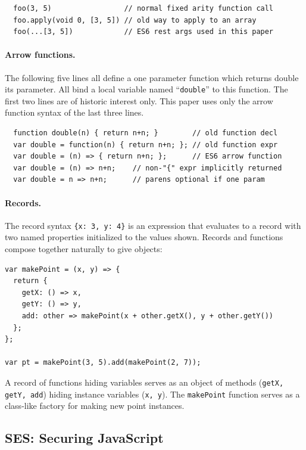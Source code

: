 \documentclass{llncs}
\begin{document}
\begin{verbatim}
  foo(3, 5)                 // normal fixed arity function call
  foo.apply(void 0, [3, 5]) // old way to apply to an array
  foo(...[3, 5])            // ES6 rest args used in this paper
\end{verbatim}

\paragraph{Arrow functions.} The following five lines all define a one parameter function which returns double its parameter. All bind a local variable named ``{\tt double}'' to this function. The first two lines are of historic interest only. This paper uses only the arrow function syntax of the last three lines.

\begin{verbatim}
  function double(n) { return n+n; }        // old function decl
  var double = function(n) { return n+n; }; // old function expr
  var double = (n) => { return n+n; };      // ES6 arrow function
  var double = (n) => n+n;    // non-"{" expr implicitly returned
  var double = n => n+n;      // parens optional if one param
\end{verbatim}

\paragraph{Records.} The record syntax {\tt \{x: 3, y: 4\}} is an expression that evaluates to a record with two named properties initialized to the values shown. Records and functions compose together naturally to give objects:

\begin{verbatim}
var makePoint = (x, y) => {
  return {
    getX: () => x,
    getY: () => y,
    add: other => makePoint(x + other.getX(), y + other.getY())
  };
};

var pt = makePoint(3, 5).add(makePoint(2, 7));
\end{verbatim}

A record of functions hiding variables serves as an object of methods ({\tt getX, getY, add}) hiding instance variables ({\tt x, y}). The {\tt makePoint} function serves as a class-like factory for making new point instances.


\subsection{SES: Securing JavaScript}
\end{document}
